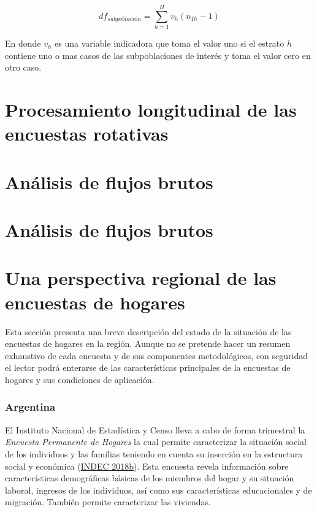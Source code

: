 \documentclass[
  12pt,
  spanish,
]{book}
\begin{document}
\[
df_{subpoblación} = \sum_{h=1}^H v_h(n_{Ih} - 1)
\]

En donde \(v_h\) es una variable indicadora que toma el valor uno si el estrato \(h\) contiene uno o mas casos de las subpoblaciones de interés y toma el valor cero en otro caso.

\hypertarget{procesamiento-longitudinal-de-las-encuestas-rotativas}{%
\chapter{Procesamiento longitudinal de las encuestas rotativas}\label{procesamiento-longitudinal-de-las-encuestas-rotativas}}

\hypertarget{anuxe1lisis-de-flujos-brutos}{%
\chapter{Análisis de flujos brutos}\label{anuxe1lisis-de-flujos-brutos}}

\hypertarget{anuxe1lisis-de-flujos-brutos-1}{%
\chapter{Análisis de flujos brutos}\label{anuxe1lisis-de-flujos-brutos-1}}

\hypertarget{appendix-appendix}{%
\appendix}


\hypertarget{una-perspectiva-regional-de-las-encuestas-de-hogares}{%
\chapter{Una perspectiva regional de las encuestas de hogares}\label{una-perspectiva-regional-de-las-encuestas-de-hogares}}

Esta sección presenta una breve descripción del estado de la situación de las encuestas de hogares en la región. Aunque no se pretende hacer un resumen exhaustivo de cada encuesta y de sus componentes metodológicos, con seguridad el lector podrá enterarse de las características principales de la encuestas de hogares y sus condiciones de aplicación.

\hypertarget{argentina}{%
\subsection*{Argentina}\label{argentina}}

El Instituto Nacional de Estadística y Censo lleva a cabo de forma trimestral la \emph{Encuesta Permanente de Hogares} la cual permite caracterizar la situación social de los individuos y las familias teniendo en cuenta su inserción en la estructura social y económica (\protect\hyperlink{ref-INDEC-AR}{INDEC 2018b}). Esta encuesta revela información sobre características demográficas básicas de los miembros del hogar y su situación laboral, ingresos de los individuos, así como sus características educacionales y de migración. También permite caracterizar las viviendas.
\end{document}
